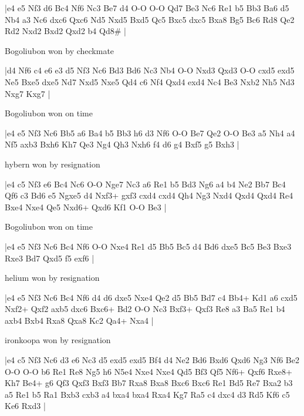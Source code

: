 \makegametitle
|e4 e5 Nf3 d6 Bc4 Nf6 Nc3 Be7 d4 O-O O-O Qd7 Be3 Nc6 Re1 b5 Bb3 Ba6 d5 Nb4 a3 Nc6 dxc6 Qxc6 Nd5 Nxd5 Bxd5 Qc5 Bxc5 dxc5 Bxa8 Bg5 Bc6 Rd8 Qe2 Rd2 Nxd2 Bxd2 Qxd2 b4 Qd8\#  |

\showboard

Bogoliubon won by checkmate

\makegametitle
|d4 Nf6 c4 e6 e3 d5 Nf3 Nc6 Bd3 Bd6 Nc3 Nb4 O-O Nxd3 Qxd3 O-O cxd5 exd5 Ne5 Bxe5 dxe5 Nd7 Nxd5 Nxe5 Qd4 c6 Nf4 Qxd4 exd4 Nc4 Be3 Nxb2 Nh5 Nd3 Nxg7 Kxg7  |

\showboard

Bogoliubon won on time

\makegametitle
|e4 e5 Nf3 Nc6 Bb5 a6 Ba4 b5 Bb3 h6 d3 Nf6 O-O Be7 Qe2 O-O Be3 a5 Nh4 a4 Nf5 axb3 Bxh6 Kh7 Qe3 Ng4 Qh3 Nxh6 f4 d6 g4 Bxf5 g5 Bxh3  |

\showboard

hybern won by resignation

\makegametitle
|e4 c5 Nf3 e6 Bc4 Nc6 O-O Nge7 Nc3 a6 Re1 b5 Bd3 Ng6 a4 b4 Ne2 Bb7 Bc4 Qf6 c3 Bd6 e5 Ngxe5 d4 Nxf3+ gxf3 cxd4 cxd4 Qh4 Ng3 Nxd4 Qxd4 Qxd4 Re4 Bxe4 Nxe4 Qe5 Nxd6+ Qxd6 Kf1 O-O Be3  |

\showboard

Bogoliubon won on time

\makegametitle
|e4 e5 Nf3 Nc6 Bc4 Nf6 O-O Nxe4 Re1 d5 Bb5 Bc5 d4 Bd6 dxe5 Bc5 Be3 Bxe3 Rxe3 Bd7 Qxd5 f5 exf6  |

\showboard

helium won by resignation

\makegametitle
|e4 e5 Nf3 Nc6 Bc4 Nf6 d4 d6 dxe5 Nxe4 Qe2 d5 Bb5 Bd7 c4 Bb4+ Kd1 a6 cxd5 Nxf2+ Qxf2 axb5 dxc6 Bxc6+ Bd2 O-O Nc3 Bxf3+ Qxf3 Re8 a3 Ba5 Re1 b4 axb4 Bxb4 Rxa8 Qxa8 Kc2 Qa4+ Nxa4  |

\showboard

ironkoopa won by resignation

\makegametitle
|e4 c5 Nf3 Nc6 d3 e6 Nc3 d5 exd5 exd5 Bf4 d4 Ne2 Bd6 Bxd6 Qxd6 Ng3 Nf6 Be2 O-O O-O b6 Re1 Re8 Ng5 h6 N5e4 Nxe4 Nxe4 Qd5 Bf3 Qf5 Nf6+ Qxf6 Rxe8+ Kh7 Be4+ g6 Qf3 Qxf3 Bxf3 Bb7 Rxa8 Bxa8 Bxc6 Bxc6 Re1 Bd5 Re7 Bxa2 b3 a5 Re1 b5 Ra1 Bxb3 cxb3 a4 bxa4 bxa4 Rxa4 Kg7 Ra5 c4 dxc4 d3 Rd5 Kf6 c5 Ke6 Rxd3  |

